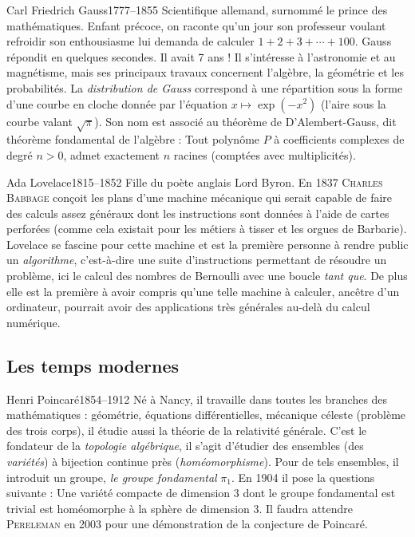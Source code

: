\documentclass[10pt,class=article,crop=false]{standalone}
\begin{document}
\begin{multicols}{2}
\begin{biographie}{Carl Friedrich Gauss}{1777--1855}
Scientifique allemand, surnommé le \og{}prince des mathématiques\fg{}.
Enfant précoce, on raconte qu'un jour son professeur voulant refroidir son enthousiasme lui demanda de calculer $1+2+3+\cdots+100$. Gauss répondit en quelques secondes. Il avait 7 ans ! Il s'intéresse à l'astronomie et au magnétisme, mais ses principaux travaux concernent l'algèbre, la géométrie et les probabilités. La \emph{distribution de Gauss} correspond à une répartition sous la forme d'une \og{}courbe en cloche\fg{} donnée par l'équation $x \mapsto \exp(-x^2)$ (l'aire sous la courbe valant $\sqrt\pi$).
Son nom est associé au théorème de D'Alembert-Gauss, dit théorème fondamental de l'algèbre : \og{}Tout polynôme $P$ à coefficients complexes de degré $n>0$, admet exactement $n$ racines (comptées avec multiplicités).\fg{}
\end{biographie}	


\begin{biographie}{Ada Lovelace}{1815--1852}
Fille du poète anglais Lord Byron. En 1837 \textsc{Charles Babbage} conçoit les plans d'une machine mécanique qui serait capable de faire des calculs assez généraux dont les instructions sont données à l'aide de cartes perforées (comme cela existait pour les métiers à tisser et les orgues de Barbarie). Lovelace se fascine pour cette machine et est la première personne à rendre public un \emph{algorithme}, c'est-à-dire une suite d'instructions permettant de résoudre un problème, ici le calcul des nombres de Bernoulli avec une boucle \emph{tant que}. De plus elle est la première à avoir compris qu'une telle machine à calculer, ancêtre d'un ordinateur, pourrait avoir des applications  très générales au-delà du calcul numérique. 
\end{biographie}


\subsection{Les temps modernes}


\begin{biographie}{Henri Poincaré}{1854--1912}
Né à Nancy, il travaille dans toutes les branches des mathématiques : géométrie, équations différentielles, mécanique céleste (problème des trois corps), 
il étudie aussi la théorie de la relativité générale.
C'est le fondateur de la \emph{topologie algébrique}, il s'agit d'étudier des ensembles (des \emph{variétés}) à bijection continue près (\emph{homéomorphisme}). Pour de tels ensembles, il introduit un groupe, \emph{le groupe fondamental} $\pi_1$. En 1904 il pose la questions suivante : \og{}Une variété compacte de dimension 3 dont le groupe fondamental est trivial est homéomorphe à la sphère de dimension 3.\fg{} Il faudra attendre \textsc{Pereleman} en 2003 pour une démonstration de la conjecture de Poincaré.
\end{biographie}



\end{multicols}
\end{document}
